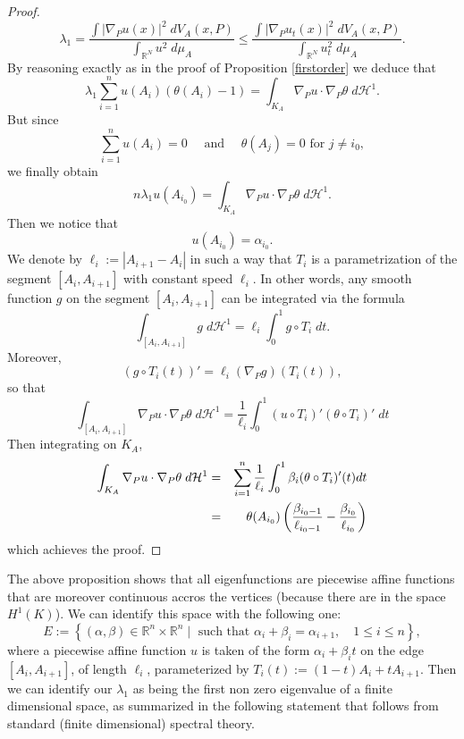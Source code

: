 \documentclass[12pt,english]{smfart} %
\theoremstyle{remark}
\newcommand{\R}{\mathbb{R}}
\begin{document}
\begin{proof}
$$ \lambda_1=\frac{\int |\nabla_P u(x)|^2 \;d V_A(x,P)}{\int_{\mathbb{R}^N} u^2\;d\mu_A}\leqslant   \frac{\int |\nabla_P u_t(x)|^2 \;d V_A(x,P)}{\int_{\mathbb{R}^N} u_t^2\;d\mu_A}.$$
By reasoning exactly as in the proof of Proposition \ref{firstorder} we deduce that 
$$\lambda_1 \sum_{i=1}^n  u(A_i)( \theta(A_i)-1) = \int_{K_A} \nabla_P u \cdot \nabla_P \theta \; d\mathcal{H}^1.$$
But since 
$$ \sum_{i=1}^n  u(A_i)=0 \quad \text{ and } \quad \theta(A_j)=0 \text{ for }j \not = i_0,$$
we finally obtain
$$n\lambda_1   u(A_{i_0})   = \int_{K_A} \nabla_P u \cdot \nabla_P \theta \; d\mathcal{H}^1.$$
Then we notice that 
$$u(A_{i_0})=\alpha_{i_0}.$$
We denote by $\ell_i:=|A_{i+1}-A_i|$ in such a way that $T_i$ is a parametrization of the segment $[A_i,A_{i+1}]$ with constant speed $\ell_i$. In other words, any smooth function $g$ on the segment $[A_i,A_{i+1}]$ can be integrated via the formula
$$\int_{[A_i,A_{i+1}]} g \;d\mathcal{H}^1 = \ell_i\int_{0}^1 g\circ T_i   \; dt.$$
Moreover, 
$$(g\circ T_i(t))'=\ell_i(\nabla_Pg)(T_i(t)),$$
so that 
$$\int_{[A_i,A_{i+1}]} \nabla_P u \cdot \nabla_P \theta \; d\mathcal{H}^1 =\frac{1}{\ell_i}\int_0^1 (u\circ T_i)'(\theta\circ T_i)' \; dt $$
Then integrating on $K_A$,
\begin{eqnarray}
\int_{K_A} \nabla_P u \cdot \nabla_P \theta \; d\mathcal{H}^1 &=& \sum_{i=1}^n \frac{1}{\ell_i} \int_{0}^1 \beta_i  (\theta\circ T_i)'(t) dt  \notag \\
&=&\theta(A_{i_0})\left(\frac{\beta_{i_0-1}}{\ell_{i_0-1}} - \frac{\beta_{i_0}}{\ell_{i_0}}\right)    \notag 
\end{eqnarray}
which achieves the proof.
 \end{proof}
 
 
  The above proposition  shows that all eigenfunctions are piecewise affine functions that are moreover continuous accros the vertices (because there are in the space $H^1(K)$). We can identify this space with the following one:
  $$E:=\left\{(\alpha,\beta) \in \R^n \times \R^n  \;|\; \text{ such that }  \alpha_i+\beta_i =\alpha_{i+1} ,  \quad 1\leqslant i \leqslant n\right\},$$
where a piecewise affine function $u$ is taken of the form $\alpha_i +\beta_i t$ on the edge $[A_i,A_{i+1}]$, of length $\ell_i$, parameterized by $T_i(t) := (1-t)A_i + tA_{i+1}$. Then we can identify our $\lambda_1$ as being the first non zero eigenvalue of a finite dimensional space, as  summarized in the following statement that follows from standard (finite dimensional) spectral theory.
 
\end{document}
